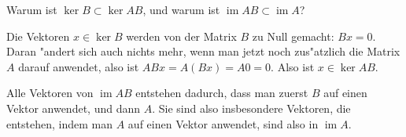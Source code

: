 Warum ist $\operatorname{ker}B \subset \operatorname{ker}AB$, und
warum ist $\operatorname{im}AB\subset\operatorname{im}A$?

\begin{loesung}
Die Vektoren $x\in\operatorname{ker}B$ werden von der Matrix $B$ zu
Null gemacht: $Bx=0$. Daran "andert sich auch nichts mehr, wenn man jetzt
noch zus"atzlich die Matrix $A$ darauf anwendet, also ist $ABx=A(Bx)=A0=0$.
Also ist $x\in\operatorname{ker}AB$.

Alle Vektoren von $\operatorname{im}AB$ entstehen dadurch, dass
man zuerst $B$ auf einen Vektor anwendet, und dann $A$. Sie sind
also insbesondere Vektoren, die entstehen, indem man $A$ auf einen
Vektor anwendet, sind also in $\operatorname{im}A$.
\end{loesung}

